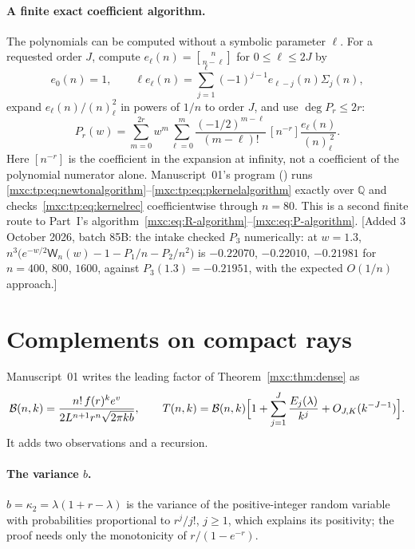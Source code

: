\documentclass[11pt]{article}
\numberwithin{equation}{section}
\theoremstyle{definition}
\theoremstyle{remark}
\newcommand{\StirOne}[2]{\genfrac{[}{]}{0pt}{}{#1}{#2}}
\begin{document}
\paragraph{A finite exact coefficient algorithm.} The polynomials can be
computed without a symbolic parameter $\ell$. For a requested order $J$,
compute $e_\ell(n)=\StirOne{n}{n-\ell}$ for $0\le\ell\le2J$ by
\begin{equation}\label{mxc:tp:eq:newtonalgorithm}
 e_0(n)=1,\qquad
 \ell e_\ell(n)=\sum_{j=1}^{\ell}(-1)^{j-1}e_{\ell-j}(n)\Sigma_j(n),
\end{equation}
expand $e_\ell(n)/(n)_\ell^2$ in powers of $1/n$ to order $J$, and use
$\deg P_r\le2r$:
\begin{equation}\label{mxc:tp:eq:pkernelalgorithm}
 P_r(w)=\sum_{m=0}^{2r}w^m\sum_{\ell=0}^{m}
 \frac{(-1/2)^{m-\ell}}{(m-\ell)!}\,
 [n^{-r}]\frac{e_\ell(n)}{(n)_\ell^{\,2}}.
\end{equation}
Here $[n^{-r}]$ is the coefficient in the expansion at infinity, not a
coefficient of the polynomial numerator alone. Manuscript~01's program
() runs
\eqref{mxc:tp:eq:newtonalgorithm}--\eqref{mxc:tp:eq:pkernelalgorithm} exactly
over $\mathbb Q$ and checks~\eqref{mxc:tp:eq:kernelrec} coefficientwise
through $n=80$. This is a second finite route to Part~I's
algorithm~\eqref{mxc:eq:R-algorithm}--\eqref{mxc:eq:P-algorithm}.
[Added 3 October 2026, batch 85B: the intake checked $P_3$ numerically:
at $w=1.3$, $n^3\bigl(e^{-w/2}\mathsf W_n(w)-1-P_1/n-P_2/n^2\bigr)$ is
$-0.22070$, $-0.22010$, $-0.21981$ for $n=400$, $800$, $1600$, against
$P_3(1.3)=-0.21951$, with the expected $O(1/n)$ approach.]

\section{Complements on compact rays}\label{mxc:tp:sec:saddle}

Manuscript~01 writes the leading factor of Theorem~\ref{mxc:thm:dense} as
\begin{equation}\label{mxc:tp:eq:Bnk}
 \mathcal B(n,k)=\frac{n!\,f(r)^ke^{v}}{2L^{n+1}r^n\sqrt{2\pi kb}},
 \qquad
 T(n,k)=\mathcal B(n,k)\Bigl[1+\sum_{j=1}^J\frac{E_j(\lambda)}{k^j}
 +O_{J,K}(k^{-J-1})\Bigr].
\end{equation}
It adds two observations and a recursion.

\paragraph{The variance $b$.} $b=\kappa_2=\lambda(1+r-\lambda)$ is the
variance of the positive-integer random variable with probabilities
proportional to $r^j/j!$, $j\ge1$, which explains its positivity; the
proof needs only the monotonicity of $r/(1-e^{-r})$.
\end{document}
